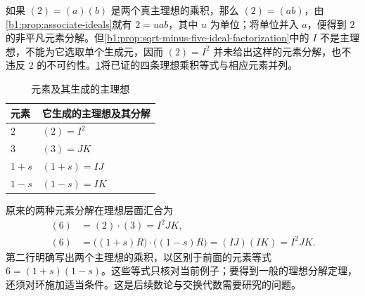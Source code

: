 如果 \((2)=(a)(b)\) 是两个真主理想的乘积，那么 \((2)=(ab)\)，由\cref{b1:prop:associate-ideals}就有 \(2=uab\)，其中 \(u\) 为单位；将单位并入 \(a\)，便得到 \(2\) 的非平凡元素分解。但\cref{b1:prop:sqrt-minus-five-ideal-factorization}中的 \(I\) 不是主理想，不能为它选取单个生成元，因而 \((2)=I^2\) 并未给出这样的元素分解，也不违反 \(2\) 的不可约性。\cref{b1:tab:element-ideal-factorizations}将已证的四条理想乘积等式与相应元素并列。
\begin{table}[H]
	\centering
	\caption{元素及其生成的主理想}
	\label{b1:tab:element-ideal-factorizations}
	\begin{tabular}{@{}ll@{}}
		\toprule
		元素 & 它生成的主理想及其分解 \\
		\midrule
		\(2\) & \((2)=I^2\) \\
		\(3\) & \((3)=JK\) \\
		\(1+s\) & \((1+s)=IJ\) \\
		\(1-s\) & \((1-s)=IK\) \\
		\bottomrule
	\end{tabular}
\end{table}
原来的两种元素分解在理想层面汇合为
\[
	\begin{aligned}
		(6)&=(2)\cdot(3)=I^2JK,\\
		(6)&=\bigl((1+s)R\bigr)\cdot\bigl((1-s)R\bigr) =(IJ)(IK)=I^2JK.
	\end{aligned}
\]
第二行明确写出两个主理想的乘积，以区别于前面的元素等式 \(6=(1+s)(1-s)\)。这些等式只核对当前例子；要得到一般的理想分解定理，还须对环施加适当条件。这是后续数论与交换代数需要研究的问题。
